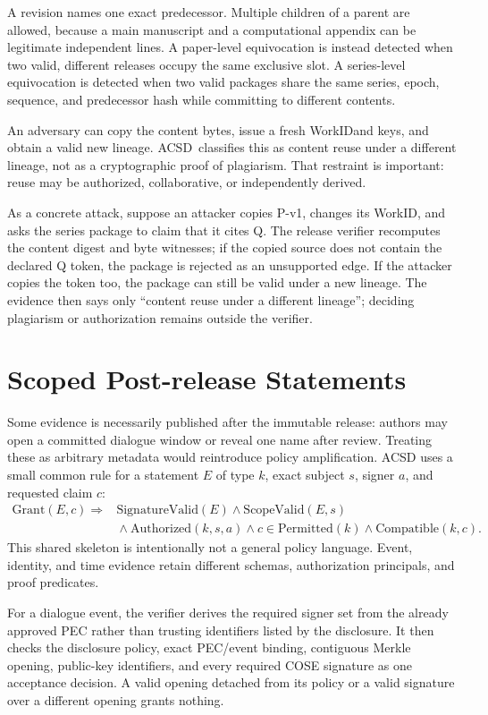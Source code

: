 \documentclass[11pt]{article}
\newcommand{\workid}{\textsf{WorkID}}
\newcommand{\acsd}{\textsc{ACSD}}
\begin{document}
A revision names one exact predecessor. Multiple children of a parent are allowed, because a main manuscript and a computational appendix can be legitimate independent lines. A paper-level equivocation is instead detected when two valid, different releases occupy the same exclusive slot. A series-level equivocation is detected when two valid packages share the same series, epoch, sequence, and predecessor hash while committing to different contents.

An adversary can copy the content bytes, issue a fresh \workid and keys, and obtain a valid new lineage. \acsd\ classifies this as content reuse under a different lineage, not as a cryptographic proof of plagiarism. That restraint is important: reuse may be authorized, collaborative, or independently derived.

As a concrete attack, suppose an attacker copies P-v1, changes its WorkID,
and asks the series package to claim that it cites Q. The release verifier
recomputes the content digest and byte witnesses; if the copied source does not
contain the declared Q token, the package is rejected as an unsupported edge.
If the attacker copies the token too, the package can still be valid under a
new lineage. The evidence then says only “content reuse under a different
lineage”; deciding plagiarism or authorization remains outside the verifier.

\section{Scoped Post-release Statements}

Some evidence is necessarily published after the immutable release: authors
may open a committed dialogue window or reveal one name after review. Treating
these as arbitrary metadata would reintroduce policy amplification. ACSD uses
a small common rule for a statement $E$ of type $k$, exact subject $s$, signer
$a$, and requested claim $c$:
\[
\begin{aligned}
 \mathrm{Grant}(E,c) \Rightarrow{}&
 \mathrm{SignatureValid}(E) \land \mathrm{ScopeValid}(E,s) \\
 &{}\land \mathrm{Authorized}(k,s,a)
 \land c\in\mathrm{Permitted}(k)
 \land \mathrm{Compatible}(k,c).
\end{aligned}
\]
This shared skeleton is intentionally not a general policy language. Event,
identity, and time evidence retain different schemas, authorization principals,
and proof predicates.

For a dialogue event, the verifier derives the required signer set from the
already approved PEC rather than trusting identifiers listed by the disclosure.
It then checks the disclosure policy, exact PEC/event binding, contiguous
Merkle opening, public-key identifiers, and every required COSE signature as
one acceptance decision. A valid opening detached from its policy or a valid
signature over a different opening grants nothing.
\end{document}

